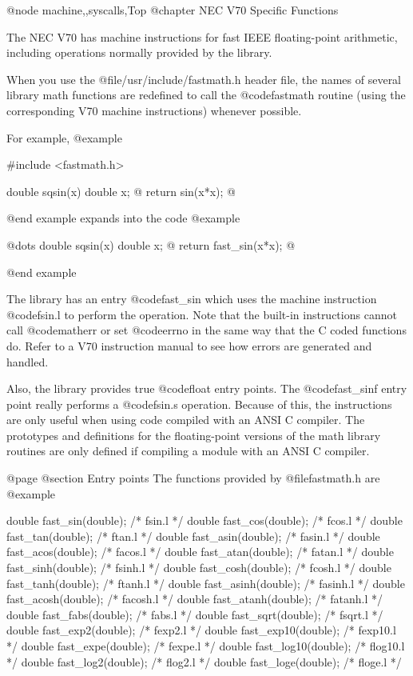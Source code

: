 @node machine,,syscalls,Top
@chapter NEC V70 Specific Functions

The NEC V70 has machine instructions for fast IEEE floating-point
arithmetic, including operations normally provided by the library.  

When you use the @file{/usr/include/fastmath.h} header file, the
names of several library math functions are redefined to call the
@code{fastmath} routine (using the corresponding V70 machine instructions)
whenever possible.

For example,
@example

#include <fastmath.h>

double sqsin(x)
double x;
@{
  return sin(x*x);
@}

@end example
expands into the code
@example

@dots{}
double sqsin(x)
double x;
@{
  return fast_sin(x*x);
@}

@end example

The library has an entry @code{fast_sin} which uses the machine
instruction @code{fsin.l} to perform the operation.  Note that the
built-in instructions cannot call @code{matherr} or set @code{errno}
in the same way that the C coded functions do.  Refer to a V70
instruction manual to see how errors are generated and handled.

Also, the library provides true @code{float} entry points.  The
@code{fast_sinf} entry point really performs a @code{fsin.s}
operation.  Because of this, the instructions are only useful when
using code compiled with an ANSI C compiler.  The prototypes
and definitions for the floating-point versions of the math library
routines are only defined if compiling a module with an ANSI C
compiler.

@page
@section Entry points 
The functions provided by @file{fastmath.h} are
@example

 double fast_sin(double);	/*	fsin.l */
 double fast_cos(double);	/*	fcos.l */
 double fast_tan(double);	/*	ftan.l */
 double fast_asin(double);	/*	fasin.l */
 double fast_acos(double);	/*	facos.l */
 double fast_atan(double);	/*	fatan.l */
 double fast_sinh(double);	/*	fsinh.l */
 double fast_cosh(double);	/*	fcosh.l */
 double fast_tanh(double);	/*	ftanh.l */
 double fast_asinh(double);	/*	fasinh.l */
 double fast_acosh(double);	/*	facosh.l */
 double fast_atanh(double);	/*	fatanh.l */
 double fast_fabs(double);	/*	fabs.l */
 double fast_sqrt(double);	/*	fsqrt.l */
 double fast_exp2(double);	/*	fexp2.l */
 double fast_exp10(double);	/*	fexp10.l */
 double fast_expe(double);	/*	fexpe.l */
 double fast_log10(double);	/*	flog10.l */
 double fast_log2(double);	/*	flog2.l */
 double fast_loge(double);	/*	floge.l */

